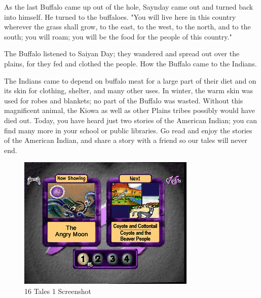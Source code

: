 As the last Buffalo came up out of the hole, Saynday came out and turned back into himself. He turned to the buffaloes. "You will live here in this country wherever the grass shall grow, to the east, to the west, to the north, and to the south; you will roam; you will be the food for the people of this country."

The Buffalo listened to Saiyan Day; they wandered and spread out over the plains, for they fed and clothed the people. How the Buffalo came to the Indians.

The Indians came to depend on buffalo meat for a large part of their diet and on its skin for clothing, shelter, and many other uses. In winter, the warm skin was used for robes and blankets; no part of the Buffalo was wasted. Without this magnificent animal, the Kiowa as well as other Plains tribes possibly would have died out. Today, you have heard just two stories of the American Indian; you can find many more in your school or public libraries. Go read and enjoy the stories of the American Indian, and share a story with a friend so our tales will never end.

\clearpage
\newpage

\begin{figure}
    \centering
    \includegraphics[width=\textwidth/2]{"./Games/16Tales/16Tales1Screenshot.png"}
    \caption{16 Tales 1 Screenshot}
\end{figure}